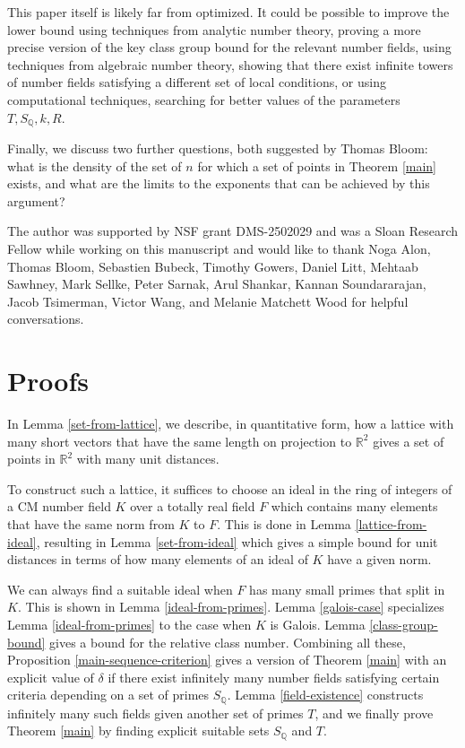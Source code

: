 \documentclass[12pt]{amsart}
\theoremstyle{remark}
\theoremstyle{definition}
\begin{document}
This paper itself is likely far from optimized. It could be possible to improve the lower bound using techniques from analytic number theory, proving a more precise version of the key class group bound \cite[Corollary 3]{Louboutin2000} for the relevant number fields, using techniques from algebraic number theory, showing that there exist infinite towers of number fields satisfying a different set of local conditions, or using computational techniques, searching for better values of the parameters $T, S_{\mathbb Q}, k, R$.


Finally, we discuss two further questions, both suggested by Thomas Bloom: what is the density of the set of $n$ for which a set of points in Theorem \ref{main} exists, and what are the limits to the exponents that can be achieved by this argument?


The author was supported by NSF grant DMS-2502029 and was a Sloan Research Fellow while working on this manuscript and would like to thank Noga Alon, Thomas Bloom, Sebastien Bubeck, Timothy Gowers, Daniel Litt, Mehtaab Sawhney, Mark Sellke, Peter Sarnak, Arul Shankar, Kannan Soundararajan, Jacob Tsimerman, Victor Wang, and Melanie Matchett Wood for helpful conversations. 


\section{Proofs}

In Lemma \ref{set-from-lattice}, we describe, in quantitative form, how a lattice with many short vectors that have the same length on projection to $\mathbb R^2$ gives a set of points in $\mathbb R^2$ with many unit distances.


To construct such a lattice, it suffices to choose an ideal in the ring of integers of a CM number field $K$ over a totally real field $F$ which contains many elements that have the same norm from $K$ to $F$. This is done in Lemma \ref{lattice-from-ideal}, resulting in Lemma \ref{set-from-ideal} which gives a simple bound for unit distances in terms of how many elements of an ideal of $K$ have a given norm.

 We can always find a suitable ideal when $F$ has many small primes that split in $K$.  This is shown in Lemma \ref{ideal-from-primes}.  Lemma \ref{galois-case} specializes Lemma \ref{ideal-from-primes} to the case when $K$ is Galois.  Lemma \ref{class-group-bound} gives a bound for the relative class number. Combining all these, Proposition \ref{main-sequence-criterion} gives a version of Theorem \ref{main} with an explicit value of $\delta$ if there exist infinitely many number fields satisfying certain criteria depending on a set of primes $S_{\mathbb Q}$. Lemma \ref{field-existence} constructs infinitely many such fields given another set of primes $T$, and we finally prove Theorem \ref{main} by finding explicit suitable sets $S_{\mathbb Q}$ and $T$.
\end{document}
